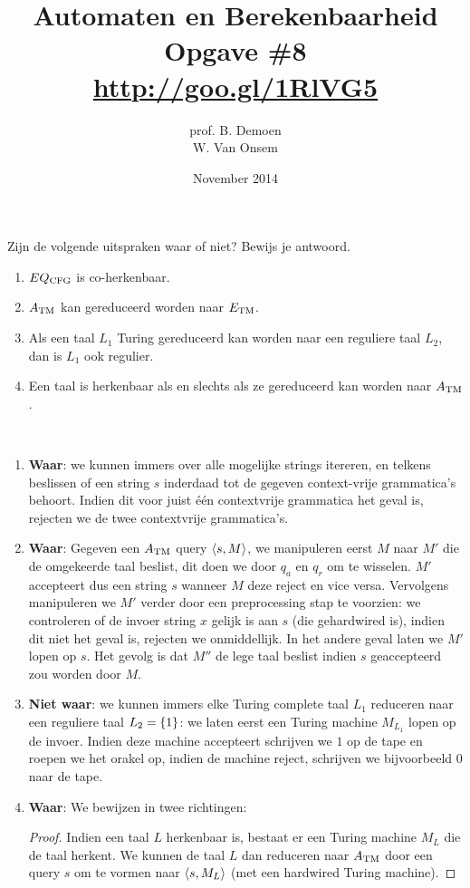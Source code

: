 \documentclass[a4paper]{article}
\title{Automaten en Berekenbaarheid\\Opgave \#8\\\url{http://goo.gl/1RlVG5}}
\author{prof. B. Demoen\\W. Van Onsem}
\date{November 2014}
\begin{document}
\maketitle

\begin{question}
Zijn de volgende uitspraken waar of niet? Bewijs je antwoord.
\begin{enumerate}
  \item $EQ_{\rm CFG}$ is co-herkenbaar.
  \item $A_{\rm TM}$ kan gereduceerd worden naar $E_{\rm TM}$.
  \item Als een taal $L_1$ Turing gereduceerd kan worden naar een reguliere taal $L_2$, dan is $L_1$ ook regulier.
  \item Een taal is herkenbaar als en slechts als ze gereduceerd kan worden naar $A_{\rm TM}$.
\end{enumerate}
\begin{answer}~~
\begin{enumerate}
 \item \textbf{Waar}: we kunnen immers over alle mogelijke strings itereren, en telkens beslissen of een string $s$ inderdaad tot de gegeven context-vrije grammatica's behoort. Indien dit voor juist \'e\'en contextvrije grammatica het geval is, rejecten we de twee contextvrije grammatica's.
 \item \textbf{Waar}: Gegeven een $A_{\rm TM}$ query $\left\langle s,M \right\rangle$, we manipuleren eerst $M$ naar $M'$ die de omgekeerde taal beslist, dit doen we door $q_a$ en $q_r$ om te wisselen. $M'$ accepteert dus een string $s$ wanneer $M$ deze reject en vice versa. Vervolgens manipuleren we $M'$ verder door een preprocessing stap te voorzien: we controleren of de invoer string $x$ gelijk is aan $s$ (die gehardwired is), indien dit niet het geval is, rejecten we onmiddellijk. In het andere geval laten we $M'$ lopen op $s$. Het gevolg is dat $M''$ de lege taal beslist indien $s$ geaccepteerd zou worden door $M$.
 \item \textbf{Niet waar}: we kunnen immers elke Turing complete taal $L_1$ reduceren naar een reguliere taal $L_2=\left\{ 1 \right\}$: we laten eerst een Turing machine $M_{L_1}$ lopen op de invoer. Indien deze machine accepteert schrijven we $1$ op de tape en roepen we het orakel op, indien de machine reject, schrijven we bijvoorbeeld $0$ naar de tape.
 \item \textbf{Waar}: We bewijzen in twee richtingen:
 \begin{proof}
 Indien een taal $L$ herkenbaar is, bestaat er een Turing machine $M_L$ die de taal herkent. We kunnen de taal $L$ dan reduceren naar $A_{\rm TM}$ door een query $s$ om te vormen naar $\left\langle s,M_L \right\rangle$ (met een hardwired Turing machine).

\end{proof}
\end{enumerate}
\end{answer}
\end{question}
\end{document}
